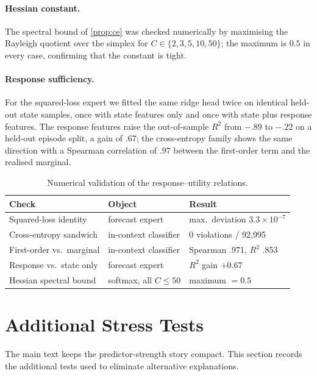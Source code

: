\paragraph{Hessian constant.} The spectral bound of \cref{prop:ce} was checked
numerically by maximising the Rayleigh quotient over the simplex for
$C\in\{2,3,5,10,50\}$; the maximum is $0.5$ in every case, confirming that the
constant is tight.

\paragraph{Response sufficiency.} For the squared-loss expert we fitted the same
ridge head twice on identical held-out state samples, once with state features
only and once with state plus response features. The response features raise the
out-of-sample $R^2$ from $-.89$ to $-.22$ on a held-out episode split, a gain of
$.67$; the cross-entropy family shows the same direction with a Spearman
correlation of $.97$ between the first-order term and the realised marginal.

\begin{table}[t]
 \centering
 \small
 \caption{Numerical validation of the response--utility relations.}
 \label{tab:theory-validation-app}
 \begin{tabular}{lll}
  \toprule
  Check & Object & Result \\
  \midrule
  Squared-loss identity & forecast expert & max.\ deviation $3.3\times10^{-7}$\\
  Cross-entropy sandwich & in-context classifier & 0 violations / 92{,}995\\
  First-order vs.\ marginal & in-context classifier & Spearman .971, $R^2$ .853\\
  Response vs.\ state only & forecast expert & $R^2$ gain $+0.67$\\
  Hessian spectral bound & softmax, all $C\le 50$ & maximum $=0.5$\\
  \bottomrule
 \end{tabular}
\end{table}


\section{Additional Stress Tests}
\label{app:stress-tests}

The main text keeps the predictor-strength story compact. This section records
the additional tests used to eliminate alternative explanations.

